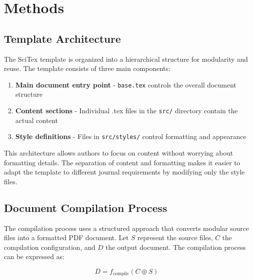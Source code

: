 
\section{Methods}
\label{sec:methods}


\subsection{Template Architecture}
\label{subsec:architecture}

The SciTex template is organized into a hierarchical structure for modularity and reuse. The template consists of three main components:

\begin{enumerate}
    \item \textbf{Main document entry point} - \verb|base.tex| controls the overall document structure
    \item \textbf{Content sections} - Individual .tex files in the \verb|src/| directory contain the actual content
    \item \textbf{Style definitions} - Files in \verb|src/styles/| control formatting and appearance
\end{enumerate}

This architecture allows authors to focus on content without worrying about formatting details. The separation of content and formatting makes it easier to adapt the template to different journal requirements by modifying only the style files.


\subsection{Document Compilation Process}
\label{subsec:compilation}

The compilation process uses a structured approach that converts modular source files into a formatted PDF document. Let $S$ represent the source files, $C$ the compilation configuration, and $D$ the output document. The compilation process can be expressed as:

\begin{equation}
D = f_{\text{compile}}(C \oplus S)
\end{equation}

